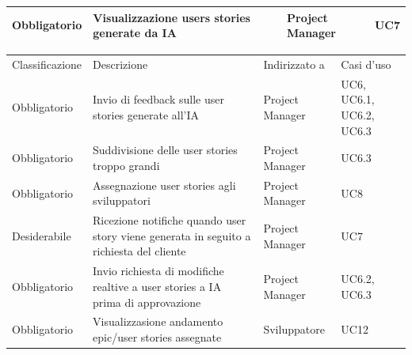 \documentclass{article}
\begin{document}
\begin{center}
\begin{tabular}{|p{3cm}|p{6cm}|p{}|p{3cm}|}
\hline
\rowcolor{LightBlue}

Obbligatorio & Visualizzazione users stories generate da IA  & Project Manager & UC7\\
\hline



\end{tabular}

    \begin{tabular}{|p{3cm}|p{6cm}|p{}|p{3cm}|}
    \rowcolor{Blue} 
\hline
Classificazione & Descrizione & Indirizzato a&Casi d'uso  \\ 
\rowcolor{LightBlue}
\hline
Obbligatorio & Invio di feedback sulle user stories generate all'IA& Project Manager&UC6, UC6.1, UC6.2, UC6.3\\
\hline
\rowcolor{LighterBlue}

Obbligatorio & Suddivisione delle user stories troppo grandi  & Project Manager& UC6.3\\
\hline
\rowcolor{LightBlue}

Obbligatorio & Assegnazione user stories agli sviluppatori& Project Manager& UC8\\
\hline
\rowcolor{LighterBlue}

Desiderabile & Ricezione notifiche quando user story viene generata in seguito a richiesta del cliente & Project Manager & UC7\\
\hline
\rowcolor{LightBlue}

Obbligatorio & Invio richiesta di modifiche realtive a user stories a IA prima di approvazione& Project Manager& UC6.2, UC6.3\\
\hline
\rowcolor{LighterBlue}

Obbligatorio & Visualizzasione andamento epic/user stories assegnate& Sviluppatore& UC12\\
\hline
\end{tabular}
\end{center}
\end{document}
